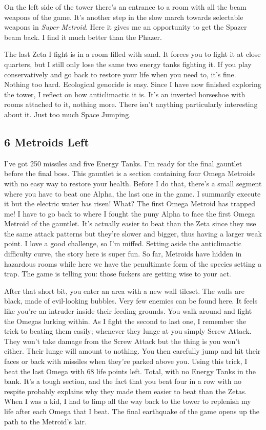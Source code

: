 \documentclass{book}
\begin{document}
On the left side of the tower there’s an entrance to a room with all the beam weapons of the game. It’s another step in the slow march towards selectable weapons in \emph{Super Metroid}. Here it gives me an opportunity to get the Spazer beam back. I find it much better than the Phazer.\par
The last Zeta I fight is in a room filled with sand. It forces you to fight it at close quarters, but I still only lose the same two energy tanks fighting it. If you play conservatively and go back to restore your life when you need to, it’s fine. Nothing too hard. Ecological genocide is easy. Since I have now finished exploring the tower, I reflect on how anticlimactic it is. It’s an inverted horseshoe with rooms attached to it, nothing more. There isn’t anything particularly interesting about it. Just too much Space Jumping.\par
\FloatBarrier\subsection*{6 Metroids Left}
I’ve got 250 missiles and five Energy Tanks. I’m ready for the final gauntlet before the final boss. This gauntlet is a section containing four Omega Metroids with no easy way to restore your health. Before I do that, there’s a small segment where you have to beat one Alpha, the last one in the game. I summarily execute it but the electric water has risen! What? The first Omega Metroid has trapped me! I have to go back to where I fought the puny Alpha to face the first Omega Metroid of the gauntlet. It’s actually easier to beat than the Zeta since they use the same attack patterns but they’re slower and bigger, thus having a larger weak point. I love a good challenge, so I’m miffed. Setting aside the anticlimactic difficulty curve, the story here is super fun. So far, Metroids have hidden in hazardous rooms while here we have the penultimate form of the species setting a trap. The game is telling you: those fuckers are getting wise to your act.\par
After that short bit, you enter an area with a new wall tileset. The walls are black, made of evil-looking bubbles. Very few enemies can be found here. It feels like you’re an intruder inside their feeding grounds. You walk around and fight the Omegas lurking within. As I fight the second to last one, I remember the trick to beating them easily; whenever they lunge at you simply Screw Attack. They won’t take damage from the Screw Attack but the thing is you won’t either. Their lunge will amount to nothing. You then carefully jump and hit their faces or back with missiles when they’re parked above you. Using this trick, I beat the last Omega with 68 life points left. Total, with no Energy Tanks in the bank. It’s a tough section, and the fact that you beat four in a row with no respite probably explains why they made them easier to beat than the Zetas. When I was a kid, I had to limp all the way back to the tower to replenish my life after each Omega that I beat. The final earthquake of the game opens up the path to the Metroid’s lair.\par
\end{document}
